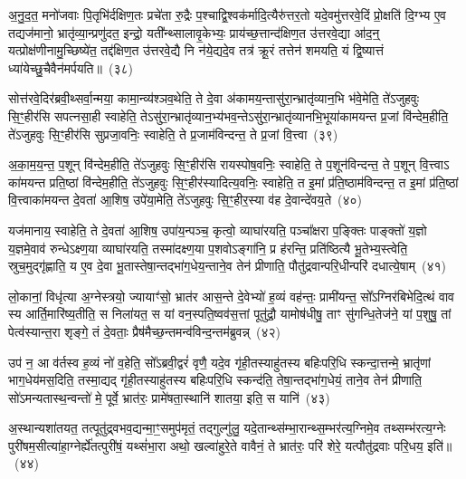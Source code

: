 अ॒नु॒द॒त॒ मनो॑जवाः पि॒तृभि॑र्दक्षिण॒तः प्रचे॑ता रु॒द्रैः प॒श्चाद्वि॒श्वक॑र्मादि॒त्यैरु॑त्तर॒तो यदे॒वमु॑त्तरवे॒दिं प्रो॒क्षति॑ दि॒ग्भ्य ए॒व तद्यज॑मानो॒ भ्रातृ॑व्या॒न्प्रणु॑दत॒ इन्द्रो॒ यती᳚न्थ्सालावृ॒केभ्यः॒ प्राय॑च्छ॒त्तान्द॑क्षिण॒त उ॑त्तरवे॒द्या आ॑द॒न्॒ यत्प्रोक्ष॑णीनामु॒च्छिष्ये॑त॒ तद्द॑क्षिण॒त उ॑त्तरवे॒द्यै नि न॑ये॒द्यदे॒व तत्र॑ क्रू॒रं तत्तेन॑ शमयति॒ यं द्वि॒ष्यात्तं ध्या॑येच्छु॒चैवैन॑मर्पयति॥~(३८)

{\anuvakamend[{मि॒मी॒ते॒ नाम॑ ध्रु॒वा\-ऽप॑ शु॒चा त्रीणि॑ च}]}%

सोत्त॑रवे॒दिर॑ब्रवी॒थ्सर्वा॒न्मया॒ कामा॒न्व्य॑श्ञव॒थेति॒ ते दे॒वा अ॑कामय॒न्तासु॑रा॒न्भ्रातृ॑व्यान॒भि भ॑वे॒मेति॒ ते॑\-ऽजुहवुः सि॒ꣳ॒हीर॑सि सपत्नसा॒ही स्वाहेति॒ ते\-ऽसु॑रा॒न्भ्रातृ॑व्यान॒भ्य॑भव॒न्ते\-ऽसु॑रा॒न्भ्रातृ॑व्यानभि॒भूया॑कामयन्त प्र॒जां वि॑न्देम॒हीति॒ ते॑\-ऽजुहवुः सि॒ꣳ॒हीर॑सि सुप्रजा॒वनिः॒ स्वाहेति॒ ते प्र॒जाम॑विन्दन्त॒ ते प्र॒जां वि॒त्त्वा~(३९)

अ॒का॒म॒य॒न्त॒ प॒शून् वि॑न्देम॒हीति॒ ते॑\-ऽजुहवुः सि॒ꣳ॒हीर॑सि रायस्पोष॒वनिः॒ स्वाहेति॒ ते प॒शून॑विन्दन्त॒ ते प॒शून् वि॒त्त्वा\-ऽ का॑मयन्त प्रति॒ष्ठां वि॑न्देम॒हीति॒ ते॑\-ऽजुहवुः सि॒ꣳ॒हीर॑स्यादित्य॒वनिः॒ स्वाहेति॒ त इ॒मां प्र॑ति॒ष्ठाम॑विन्दन्त॒ त इ॒मां प्र॑ति॒ष्ठां वि॒त्त्वाका॑मयन्त दे॒वता॑ आ॒शिष॒ उपे॑या॒मेति॒ ते॑\-ऽजुहवुः सि॒ꣳ॒हीर॒स्या व॑ह दे॒वान्दे॑वय॒ते~(४०)

यज॑मानाय॒ स्वाहेति॒ ते दे॒वता॑ आ॒शिष॒ उपा॑य॒न्पञ्च॒ कृत्वो॒ व्याघा॑रयति॒ पञ्चा᳚क्षरा प॒ङ्क्तिः पाङ्क्तो॑ य॒ज्ञो य॒ज्ञमे॒वाव॑ रुन्धे\-ऽक्ष्ण॒या व्याघा॑रयति॒ तस्मा॑दक्ष्ण॒या प॒शवो\-ऽङ्गा॑नि॒ प्र ह॑रन्ति॒ प्रति॑ष्ठित्यै भू॒तेभ्य॒स्त्वेति॒ स्रुच॒मुद्गृ॑ह्णाति॒ य ए॒व दे॒वा भू॒तास्तेषा॒न्तद्भा॑ग॒धेय॒न्ताने॒व तेन॑ प्रीणाति॒ पौतु॑द्रवान्परि॒धीन्परि॑ दधात्ये॒षाम्~(४१)

लो॒कानां॒ विधृ॑त्या अ॒ग्नेस्त्रयो॒ ज्यायाꣳ॑सो॒ भ्रात॑र आस॒न्ते दे॒वेभ्यो॑ ह॒व्यं वह॑न्तः॒ प्रामी॑यन्त॒ सो᳚\-ऽग्निर॑बिभेदि॒त्थं वाव स्य आर्ति॒मारि॑ष्य॒तीति॒ स निला॑यत॒ स यां वन॒स्पति॒ष्वव॑स॒त्तां पूतु॑द्रौ॒ यामोष॑धीषु॒ ताꣳ सु॑गन्धि॒तेज॑ने॒ यां प॒शुषु॒ तां पेत्व॑स्यान्त॒रा शृङ्गे॒ तं दे॒वताः॒ प्रैष॑मैच्छ॒न्तमन्व॑विन्द॒न्तम॑ब्रुवन्न्~(४२)

उप॑ न॒ आ व॑र्तस्व ह॒व्यं नो॑ व॒हेति॒ सो᳚\-ऽब्रवी॒द्वरं॑ वृणै॒ यदे॒व गृ॑ही॒तस्याहु॑तस्य बहिःपरि॒धि स्कन्दा॒त्तन्मे॒ भ्रातृ॑णां भाग॒धेय॑मस॒दिति॒ तस्मा॒द्यद् गृ॑ही॒तस्याहु॑तस्य बहिःपरि॒धि स्कन्द॑ति॒ तेषा॒न्तद्भा॑ग॒धेयं॒ ताने॒व तेन॑ प्रीणाति॒ सो॑\-ऽमन्यतास्थ॒न्वन्तो॑ मे॒ पूर्वे॒ भ्रात॑रः॒ प्रामे॑षता॒स्थानि॑ शातया॒ इति॒ स यानि॑~(४३)

अ॒स्थान्यशा॑तयत॒ तत्पूतु॑द्र्वभव॒द्यन्मा॒ꣳ॒समुप॑मृतं॒ तद्गुल्गु॑लु॒ यदे॒तान्थ्स॑म्भा॒रान्थ्स॒म्भर॑त्य॒ग्निमे॒व तथ्सम्भ॑रत्य॒ग्नेः पुरी॑षम॒सीत्या॑हा॒ग्नेर्\mbox{}ह्ये॑तत्पुरी॑षं॒ यथ्सं॑भा॒रा अथो॒ खल्वा॑हुरे॒ते वावैनं॒ ते भ्रात॑रः॒ परि॑ शेरे॒ यत्पौतु॑द्रवाः परि॒धय॒ इति॑॥~(४४)

